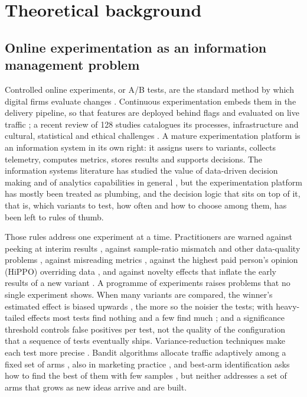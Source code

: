 \documentclass[preprint,12pt,authoryear]{elsarticle}
\theoremstyle{definition}
\begin{document}
\section{Theoretical background}
\label{sec:background}

\subsection{Online experimentation as an information management problem}

Controlled online experiments, or A/B tests, are the standard method by which digital firms evaluate changes \citep{kohavi2009, kohavi2020}. Continuous experimentation embeds them in the delivery pipeline, so that features are deployed behind flags and evaluated on live traffic \citep{bosch2012, fitzgerald2017, fabijan2017}; a recent review of 128 studies catalogues its processes, infrastructure and cultural, statistical and ethical challenges \citep{auer2021}. A mature experimentation platform is an information system in its own right: it assigns users to variants, collects telemetry, computes metrics, stores results and supports decisions. The information systems literature has studied the value of data-driven decision making and of analytics capabilities in general \citep{brynjolfsson2016, provost2013, gupta2016, duan2019, mikalef2021}, but the experimentation platform has mostly been treated as plumbing, and the decision logic that sits on top of it, that is, which variants to test, how often and how to choose among them, has been left to rules of thumb.

Those rules address one experiment at a time. Practitioners are warned against peeking at interim results \citep{johari2022}, against sample-ratio mismatch and other data-quality problems \citep{fabijan2019}, against misreading metrics \citep{dmitriev2017}, against the highest paid person's opinion (HiPPO) overriding data \citep{kohavi2009}, and against novelty effects that inflate the early results of a new variant \citep{kohavi2020}. A programme of experiments raises problems that no single experiment shows. When many variants are compared, the winner's estimated effect is biased upwards \citep{lee2018}, the more so the noisier the tests; with heavy-tailed effects most tests find nothing and a few find much \citep{azevedo2020}; and a significance threshold controls false positives per test, not the quality of the configuration that a sequence of tests eventually ships. Variance-reduction techniques make each test more precise \citep{deng2013}. Bandit algorithms allocate traffic adaptively among a fixed set of arms \citep{scott2015, russo2018}, also in marketing practice \citep{schwartz2017}, and best-arm identification asks how to find the best of them with few samples \citep{russo2020}, but neither addresses a set of arms that grows as new ideas arrive and are built.
\end{document}

